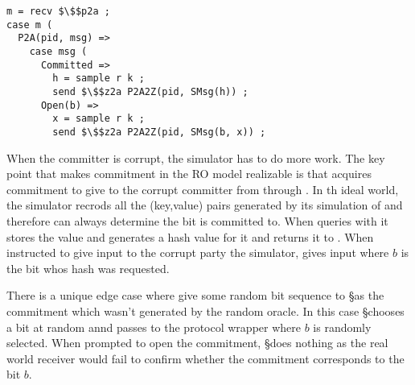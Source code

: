 \begin{lstlisting}[basicstyle=\small\BeraMonottFamily, mathescape, frame=single]
m = recv $\$$p2a ;
case m (
  P2A(pid, msg) =>
   	case msg (
      Committed =>
        h = sample r k ;
        send $\$$z2a P2A2Z(pid, SMsg(h)) ;
      Open(b) =>
	    x = sample r k ;
        send $\$$z2a P2A2Z(pid, SMsg(b, x)) ;
\end{lstlisting}

When the committer is corrupt, the simulator has to do more work. 
The key point that makes commitment in the RO model realizable is that \Z acquires commitment to give to the corrupt committer from \Fro through \A. 
In th ideal world, the simulator recrods all the (key,value) pairs generated by its simulation of \Fro and therefore can always determine the bit \Z is committed to.
When \Z queries \Sim with  it stores the value and generates a hash value for it and returns it to \Z. 
When instructed to give input to the corrupt party the simulator, \Sim gives input  where $b$ is the bit whos hash was requested.

There is a unique edge case where \Z give some random bit sequence to \S as the commitment which wasn't generated by the random oracle. 
In this case \S chooses a bit at random annd passes  to the protocol wrapper where $b$ is randomly selected.
When prompted to open the commitment, \S does nothing as the real world receiver would fail to confirm whether the commitment corresponds to the bit $b$.

